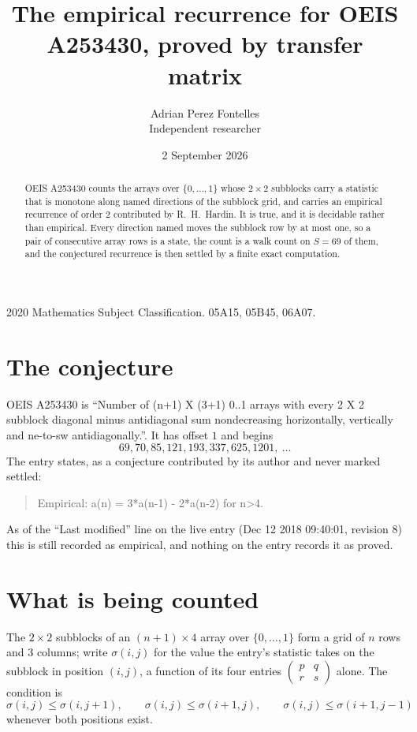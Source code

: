 \documentclass[11pt,a4paper]{article}
\title{The empirical recurrence for OEIS A253430, proved by transfer matrix}
\author{Adrian Perez Fontelles\\ \small Independent researcher}
\date{2 September 2026}
\theoremstyle{plain}
\theoremstyle{definition}
\begin{document}
\maketitle

\begin{abstract}
OEIS A253430 counts the arrays over $\{0,\dots,1\}$ whose $2\times2$ subblocks carry a
statistic that is monotone along named directions of the subblock grid, and carries an
empirical recurrence of order $2$ contributed by R.~H.~Hardin. It is true, and it is
decidable rather than empirical. Every direction named moves the subblock row by at most one,
so a pair of consecutive array rows is a state, the count is a walk count on $S=69$ of them,
and the conjectured recurrence is then settled by a finite exact computation.
\end{abstract}

\noindent\small 2020 Mathematics Subject Classification. 05A15, 05B45, 06A07.\normalsize

\section{The conjecture}

OEIS A253430 is ``Number of (n+1) X (3+1) 0..1 arrays with every 2 X 2 subblock diagonal minus antidiagonal sum nondecreasing horizontally, vertically and ne-to-sw antidiagonally.''. It has offset $1$ and begins
\[
69, 70, 85, 121, 193, 337, 625, 1201,\ \dots
\]
The entry states, as a conjecture contributed by its author and never marked settled:
\begin{quote}
Empirical: a(n) = 3*a(n-1) - 2*a(n-2) for n>4.
\end{quote}
As of the ``Last modified'' line on the live entry (Dec 12 2018 09:40:01, revision 8) this is still
recorded as empirical, and nothing on the entry records it as proved.

\section{What is being counted}

The $2\times2$ subblocks of an $(n+1)\times4$ array over $\{0,\dots,1\}$ form a grid
of $n$ rows and $3$ columns; write $\sigma(i,j)$ for the value the entry's statistic takes on
the subblock in position $(i,j)$, a function of its four entries
$\begin{pmatrix}p&q\\r&s\end{pmatrix}$ alone. The condition is
\[
\sigma(i,j)\le\sigma(i,j+1),\qquad \sigma(i,j)\le\sigma(i+1,j),\qquad \sigma(i,j)\le\sigma(i+1,j-1)
\]
whenever both positions exist.
\end{document}
